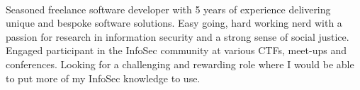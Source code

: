 
 \

\begin{cvparagraph}

Seasoned freelance software developer with 5 years of experience delivering unique and bespoke software solutions. Easy going, hard working nerd with a passion for research in information security and a strong sense of social justice. Engaged participant in the InfoSec community at various CTFs, meet-ups and conferences. Looking for a challenging and rewarding role where I would be able to put more of my InfoSec knowledge to use.

\end{cvparagraph}
